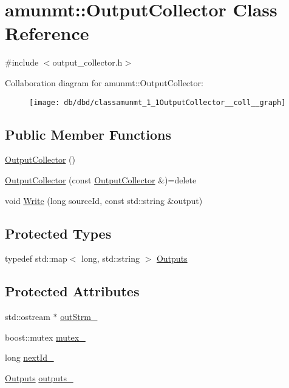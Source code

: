 \hypertarget{classamunmt_1_1OutputCollector}{}\section{amunmt\+:\+:Output\+Collector Class Reference}
\label{classamunmt_1_1OutputCollector}


{\ttfamily \#include $<$output\+\_\+collector.\+h$>$}



Collaboration diagram for amunmt\+:\+:Output\+Collector\+:
\nopagebreak
\begin{figure}[H]
\begin{center}
\leavevmode
\texttt{[image: db/dbd/classamunmt\_1\_1OutputCollector\_\_coll\_\_graph]}
\end{center}
\end{figure}
\subsection*{Public Member Functions}
\begin{DoxyCompactItemize}
\item 
\hyperlink{classamunmt_1_1OutputCollector_aff8aab7c57db78cb5163ed7d0ddd0665}{Output\+Collector} ()
\item 
\hyperlink{classamunmt_1_1OutputCollector_a2466ebd7eca86fbe9ae073f2d7f45d98}{Output\+Collector} (const \hyperlink{classamunmt_1_1OutputCollector}{Output\+Collector} \&)=delete
\item 
void \hyperlink{classamunmt_1_1OutputCollector_a29dd85f80126c091b4a476ad1ab5751b}{Write} (long source\+Id, const std\+::string \&output)
\end{DoxyCompactItemize}
\subsection*{Protected Types}
\begin{DoxyCompactItemize}
\item 
typedef std\+::map$<$ long, std\+::string $>$ \hyperlink{classamunmt_1_1OutputCollector_af13847c6e59173dcc7365b525b72ddf7}{Outputs}
\end{DoxyCompactItemize}
\subsection*{Protected Attributes}
\begin{DoxyCompactItemize}
\item 
std\+::ostream $\ast$ \hyperlink{classamunmt_1_1OutputCollector_a77a2c3b366592e7bcebcdd167fccf28b}{out\+Strm\+\_\+}
\item 
boost\+::mutex \hyperlink{classamunmt_1_1OutputCollector_a817d2d503109791aec798ea340d0dcbe}{mutex\+\_\+}
\item 
long \hyperlink{classamunmt_1_1OutputCollector_a32c7f6ee98058aa27f17e1816364fc2e}{next\+Id\+\_\+}
\item 
\hyperlink{classamunmt_1_1OutputCollector_af13847c6e59173dcc7365b525b72ddf7}{Outputs} \hyperlink{classamunmt_1_1OutputCollector_ac945f2d433081e2fc89f2915d46d1c20}{outputs\+\_\+}
\end{DoxyCompactItemize}


